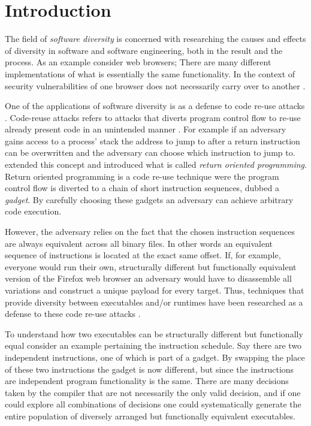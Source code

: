\chapter{Introduction}

The field of \textit{software diversity} is concerned with researching the
causes and effects of diversity in software and software engineering, both in the result
and the process. As an example consider web browsers; There are many different implementations
of what is essentially the same functionality. In the context of security vulnerabilities
of one browser does not necessarily carry over to another \cite{survey}.

One of the applications of software diversity is as a defense to code re-use attacks \cite{survey}.
Code-reuse attacks refers to attacks that diverts program control flow to re-use already
present code in an unintended manner \cite{code-re-use}. For example if an adversary gains
access to a process' stack the address to jump to after a return instruction can be
overwritten and the adversary can choose which instruction to jump to. \textcite{rop}
extended this concept and introduced what is called \textit{return oriented programming}.
Return oriented programming is a code re-use technique were the program control flow is
diverted to a chain of short instruction sequences, dubbed a \textit{gadget}. By carefully
choosing these gadgets an adversary can achieve arbitrary code execution.

However, the adversary relies on the fact that the chosen instruction sequences are always
equivalent across all binary files. In other words an equivalent sequence of instructions
is located at the exact same offset. If, for example, everyone would run their own,
structurally different but functionally equivalent version of the Firefox web browser an
adversary would have to disassemble all variations and construct a unique payload for
every target. Thus, techniques that provide diversity between executables and/or runtimes
have been researched as a defense to these code re-use attacks \cite{survey}.

To understand how two executables can be structurally different but functionally equal
consider an example pertaining the instruction schedule. Say there are two independent
instructions, one of which is part of a gadget. By swapping the place of these two
instructions the gadget is now different, but since the instructions are independent
program functionality is the same. There are many decisions taken by the compiler that are
not necessarily the only valid decision, and if one could explore all combinations of
decisions one could systematically generate the entire population of diversely arranged
but functionally equivalent executables.

